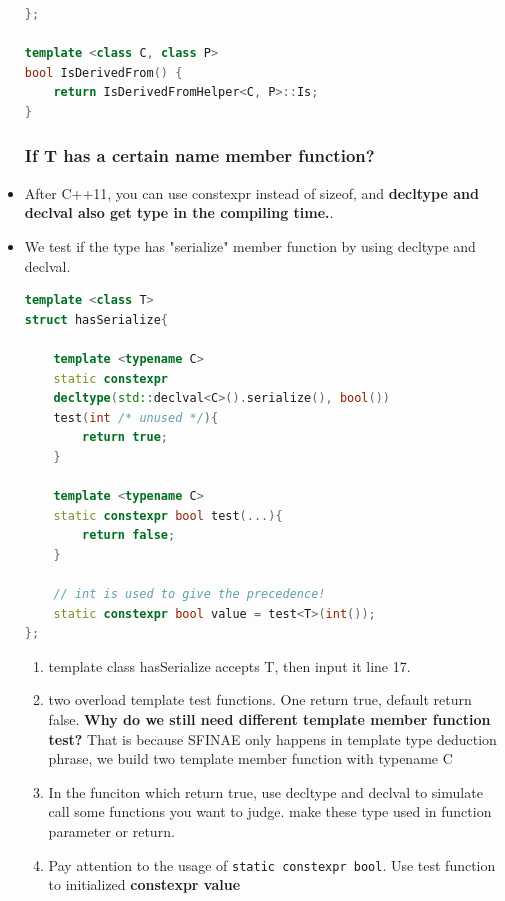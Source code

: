 \documentclass[a4paper,11pt,twoside]{book}
\begin{document}
\begin{itemize}
\begin{lstlisting}[frame=single, language=c++]
};
	
template <class C, class P> 
bool IsDerivedFrom() {
	return IsDerivedFromHelper<C, P>::Is;
}
\end{lstlisting}

\subsubsection{If T has a certain name member function?}
	
	\item After C++11, you can use constexpr instead of sizeof, and \textbf{decltype and declval also get type in the compiling time.}. 
	
	
	\item We test if the type has "serialize" member function by using decltype and declval.
	
\begin{lstlisting}[frame=single, language=c++]
template <class T> 
struct hasSerialize{
	
	template <typename C>
	static constexpr 
	decltype(std::declval<C>().serialize(), bool())
	test(int /* unused */){
		return true;
	}
	
	template <typename C>
	static constexpr bool test(...){
		return false;
	}
	
	// int is used to give the precedence!
	static constexpr bool value = test<T>(int());
};	
\end{lstlisting}
	
	\begin{enumerate}
		\item template class hasSerialize accepts T, then input it line 17.
		
		\item two overload template test functions. One return true, default return false. \textbf{Why do we still need different template member function test?} That is because SFINAE only happens in template type deduction phrase, we build two template member function with typename C
		
		\item In the funciton which return true, use decltype and declval to simulate call some functions you want to judge. make these type used in function parameter or return. 
		
		\item Pay attention to the usage of \texttt{static constexpr bool}. Use test function to initialized \textbf{constexpr value} 
	\end{enumerate}


\end{itemize}
\end{document}
